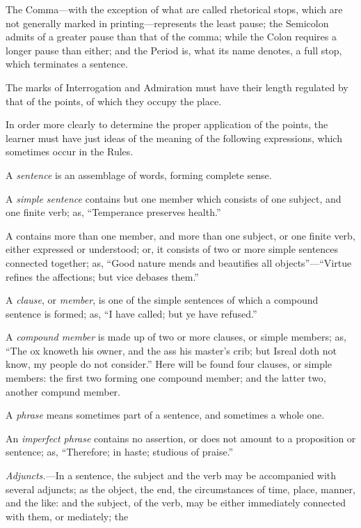 The Comma---with the exception of what are called rhetorical stops, which are
not generally marked in printing---represents the least pause; the Semicolon
admits of a greater pause than that of the comma; while the Colon requires a
longer pause than either; and the Period is, what its name denotes, a full stop,
which terminates a sentence.

The marks of Interrogation and Admiration must have their length regulated by
that of the points, of which they occupy the place.

In order more clearly to determine the proper application of the points, the
learner must have just ideas of the meaning of the following expressions, which
sometimes occur in the Rules.

A \emph{sentence} is an assemblage of words, forming complete sense.

A \emph{simple sentence} contains but one member which consists of one subject,
and one finite verb; as, ``Temperance preserves health.''

A  contains more than one member, and more than one
subject, or one finite verb, either expressed or understood; or, it consists of
two or more simple sentences connected together; as, ``Good nature mends and
beautifies all objects''---``Virtue refines the affections; but vice debases
them.''

A \emph{clause}, or \emph{member}, is one of the simple sentences of which a
compound sentence is formed; as, ``I have called; but ye have refused.''

A \emph{compound member} is made up of two or more clauses, or simple members;
as, ``The ox knoweth his owner, and the ass his master's crib; but Isreal doth
not know, my people do not consider.'' Here will be found four clauses, or
simple members: the first two forming one compound member; and the latter two,
another compund member.

A \emph{phrase} means sometimes part of a sentence, and sometimes a whole one.

An \emph{imperfect phrase} contains no assertion, or does not amount to a
proposition or sentence; as, ``Therefore; in haste; studious of praise.''

\emph{Adjuncts.}---In a sentence, the subject and the verb may be accompanied
with several adjuncts; as the object, the end, the circumstances of time, place,
manner, and the like: and the subject, of the verb, may be either immediately
connected with them, or mediately; the 
